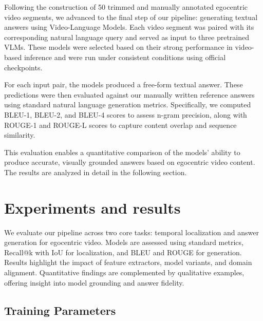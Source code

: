 \documentclass[10pt,twocolumn,letterpaper]{article}
\begin{document}
Following the construction of 50 trimmed and manually annotated egocentric video segments, we advanced to the final step of our pipeline: generating textual answers using Video-Language Models. Each video segment was paired with its corresponding natural language query and served as input to three pretrained VLMs. These models were selected based on their strong performance in video-based inference and were run under consistent conditions using official checkpoints.
	
For each input pair, the models produced a free-form textual answer. These predictions were then evaluated against our manually written reference answers using standard natural language generation metrics. Specifically, we computed BLEU-1, BLEU-2, and BLEU-4 scores to assess n-gram precision, along with ROUGE-1 and ROUGE-L scores to capture content overlap and sequence similarity.
	
This evaluation enables a quantitative comparison of the models’ ability to produce accurate, visually grounded answers based on egocentric video content. The results are analyzed in detail in the following section.
	
	
\section{Experiments and results}

We evaluate our pipeline across two core tasks: temporal localization and answer generation for egocentric video. Models are assessed using standard metrics, Recall@k with IoU for localization, and BLEU and ROUGE for generation. Results highlight the impact of feature extractors, model variants, and domain alignment. Quantitative findings are complemented by qualitative examples, offering insight into model grounding and answer fidelity.
	

\subsection{Training Parameters}
\end{document}
